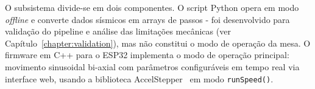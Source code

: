 O subsistema divide-se em dois componentes. O script Python opera em modo \textit{offline} e converte dados sísmicos em arrays de passos - foi desenvolvido para validação do pipeline e análise das limitações mecânicas (ver Capítulo~\ref{chapter:validation}), mas não constitui o modo de operação da mesa. O firmware em C++ para o ESP32 implementa o modo de operação principal: movimento sinusoidal bi-axial com parâmetros configuráveis em tempo real via interface web, usando a biblioteca AccelStepper~\cite{AccelStepper} em modo \texttt{runSpeed()}.
